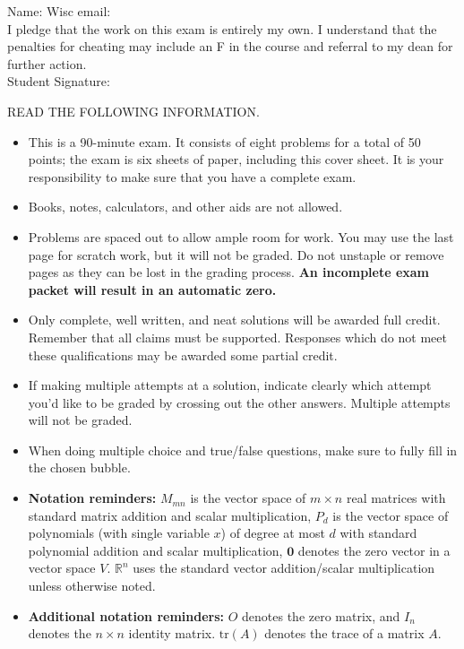 \documentclass[12pt]{extarticle}
\begin{document}
\begin{framed}
\vspace*{.2in}
Name:   Wisc email:  \vspace*{.2in} \\
I pledge that the work on this exam is entirely my own. I understand that the penalties for cheating may include an F in the course and referral to my dean for further action.
 \vspace*{.3in} \\
Student Signature: 
\end{framed}
READ THE FOLLOWING INFORMATION.
\begin{itemize}
    \item This is a 90-minute exam. It consists of eight problems for a total of 50 points; the exam is six sheets of paper, including this cover sheet. It is your responsibility to make sure that you have a complete exam.
    \item Books, notes, calculators, and other aids are not allowed.\vspace{-.1in}
    \item Problems are spaced out to allow ample room for work. You may use the last page for scratch work, but it will not be graded. Do not unstaple or remove pages as they can be lost in the grading process.  \textbf{An incomplete exam packet will result in an automatic zero.}  \vspace{-.1in}
    \item Only complete, well written, and neat solutions will be awarded full credit. Remember that all claims must be supported. Responses which do not meet these qualifications may be awarded some partial credit.\vspace{-.1in}
 \item  If making multiple attempts at a solution, indicate clearly which attempt you'd like to be graded by crossing out the other answers. Multiple attempts will not be graded.
 
 \vspace{-0.2cm} 
\item When doing multiple choice and true/false questions, make sure to fully fill in the chosen bubble.
 
 \vspace{-0.2cm} 
  \item \textbf{Notation reminders:} $M_{mn}$ is the vector space of $m\times n$ real matrices with standard matrix addition and scalar multiplication, $P_d$ is the vector space of polynomials (with single variable $x$) of degree at most $d$ with standard polynomial addition and scalar multiplication, $\mathbf{0}$ denotes the zero vector in a vector space $V$. $\mathbb{R}^n$ uses the standard vector addition/scalar multiplication unless otherwise noted.
  \item \textbf{Additional notation reminders:} $O$ denotes the zero matrix, and $I_n$ denotes the $n\times n$ identity matrix.  $\text{tr}(A)$ denotes the trace of a matrix $A$.

  
\end{itemize}
\end{document}
